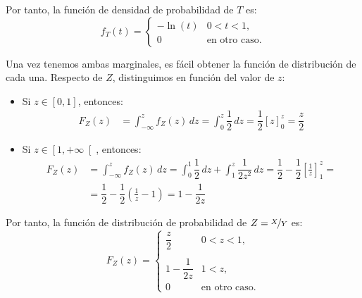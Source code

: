 \documentclass[12pt]{article}
\begin{document}
\begin{ejercicio}
\begin{enumerate}
            Por tanto, la función de densidad de probabilidad de $T$ es:
            \begin{equation*}
                f_T(t) = \begin{cases}
                    -\ln(t) & 0<t<1, \\
                    0 & \text{en otro caso}.
                \end{cases}
            \end{equation*}
    
            Una vez tenemos ambas marginales, es fácil obtener la función de distribución de cada una.
            Respecto de $Z$, distinguimos en función del valor de $z$:
            \begin{itemize}
                \item Si $z\in [0,1]$, entonces:
                \begin{align*}
                    F_Z(z)&=\int_{-\infty}^{z} f_Z(z) \, dz = \int_{0}^{z} \dfrac{1}{2} \, dz = \dfrac{1}{2}\left[z\right]_{0}^{z} = \dfrac{z}{2}
                \end{align*}
    
                \item Si $z\in \left[1,+\infty\right[$, entonces:
                \begin{align*}
                    F_Z(z)&=\int_{-\infty}^{z} f_Z(z) \, dz = \int_{0}^{1} \dfrac{1}{2} \, dz + \int_{1}^{z} \dfrac{1}{2z^2} \, dz
                    = \dfrac{1}{2} - \dfrac{1}{2}\left[\frac{1}{z}\right]_{1}^{z}
                    =\\&= \dfrac{1}{2} - \dfrac{1}{2}\left(\frac{1}{z}-1\right)
                    = 1-\dfrac{1}{2z}
                \end{align*}        
            \end{itemize}
    
            Por tanto, la función de distribución de probabilidad de $Z=\nicefrac{X}{Y}$ es:
            \begin{equation*}
                F_Z(z) = \begin{cases}
                    \dfrac{z}{2} & 0<z<1, \\ \\
                    1-\dfrac{1}{2z} & 1<z, \\
                    0 & \text{en otro caso}.
                \end{cases}
            \end{equation*}
    

\end{enumerate}
\end{ejercicio}
\end{document}
